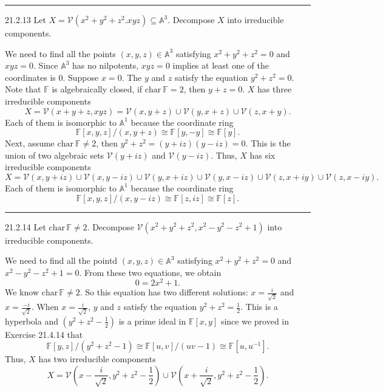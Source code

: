 \documentclass[letterpaper, 12pt]{article}
\begin{document}
\noindent\rule{7in}{2.8pt}
\begin{problem}{21.2.13}
Let \(X=\mathcal{V}(x^2+y^2+z^2.xyz)\subseteq \mathbb{A}^3\). Decompose \(X\) into irreducible components. 
\end{problem}
\begin{solution}
We need to find all the points \((x,y,z)\in \mathbb{A}^3\) satisfying \(x^2+y^2+z^2=0\) and \(xyz=0\). Since \(\mathbb{A}^3\) has no nilpotents, \(xyz=0\) implies at least one of the coordinates is \(0\). Suppose \(x=0\). The \(y\) and \(z\) satisfy the equation \(y^2+z^2=0\). Note that \(\mathbb{F}\) is algebraically closed, if \(\text{char}\ \mathbb{F}=2\), then \(y+z=0\). \(X\) has three irreducible components 
\[X=\mathcal{V}(x+y+z,xyz)=\mathcal{V}(x,y+z)\cup \mathcal{V}(y,x+z)\cup \mathcal{V}(z,x+y).\]
Each of them is isomorphic to \(\mathbb{A}^1\) because the coordinate ring 
\[\mathbb{F}[x,y,z]/(x,y+z)\cong \mathbb{F}[y,-y]\cong \mathbb{F}[y].\]
Next, assume \(\text{char}\ \mathbb{F}\neq 2\), then \(y^2+z^2=(y+iz)(y-iz)=0\). This is the union of two algebraic sets \(\mathcal{V}(y+iz)\) and \(\mathcal{V}(y-iz)\). Thus, \(X\) has six irreducible components 
\[X=\mathcal{V}(x,y+iz)\cup \mathcal{V}(x,y-iz)\cup \mathcal{V}(y,x+iz)\cup \mathcal{V}(y,x-iz)\cup \mathcal{V}(z,x+iy)\cup \mathcal{V}(z,x-iy).\]
Each of them is isomorphic to \(\mathbb{A}^1\) because the coordinate ring 
\[\mathbb{F}[x,y,z]/(x,y-iz)\cong \mathbb{F}[z,iz]\cong \mathbb{F}[z].\]
\end{solution}

\noindent\rule{7in}{2.8pt}
\begin{problem}{21.2.14}
Let \(\text{char}\, \mathbb{F}\neq 2\). Decompose \(\mathcal{V}(x^2+y^2+z^2,x^2-y^2-z^2+1)\) into irreducible components.
\end{problem}
\begin{solution}
We need to find all the pointd \((x,y,z)\in \mathbb{A}^3\) satisfying \(x^2+y^2+z^2=0\) and \(x^2-y^2-z^2+1=0\). From these two equations, we obtain 
\[0=2x^2+1.\]
We know \(\text{char}\, \mathbb{F}\neq 2\). So this equation has two different solutions: \(x=\frac{i}{\sqrt{2}}\) and \(x=\frac{-i}{\sqrt{2}}\). When \(x=\frac{i}{\sqrt{2}}\), \(y\) and \(z\) satisfy the equation \(y^2+z^2=\frac{1}{2}\). This is a hyperbola and \((y^2+z^2-\frac{1}{2})\) is a prime ideal in \(\mathbb{F}[x,y]\) since we proved in Exercise 21.4.14 that 
\[\mathbb{F}[y,z]/(y^2+z^2-1)\cong \mathbb{F}[u,v]/(uv-1)\cong \mathbb{F}[u,u^{-1}].\]
Thus, \(X\) has two irreducible components
\[X=\mathcal{V}(x-\frac{i}{\sqrt{2}},y^2+z^2-\frac{1}{2})\cup \mathcal{V}(x+\frac{i}{\sqrt{2}}, y^2+z^2-\frac{1}{2}).\]
\end{solution}
\end{document}
